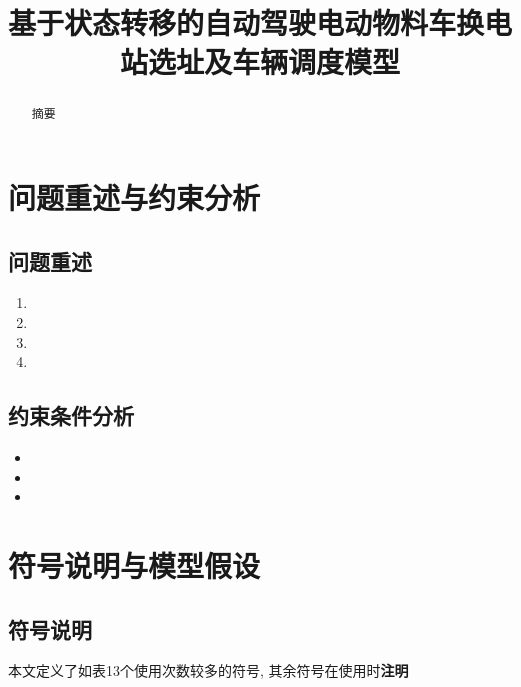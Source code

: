 \documentclass[withoutpreface,bwprint]{cumcmthesis} %
\title{基于状态转移的自动驾驶电动物料车换电站选址及车辆调度模型}
\begin{document}
	
	\maketitle
	\begin{abstract}
		摘要
		
		
		\quad
		
		
\end{abstract}


\setcounter{page}{1}    

\section{问题重述与约束分析}
\subsection{问题重述}



\begin{enumerate}
	\item 
	\item 
	\item 
	\item 
\end{enumerate}



\subsection{约束条件分析}

\begin{itemize}
	\item
	\item 
	\item 
\end{itemize}
 

\section{符号说明与模型假设}
\subsection{符号说明}
本文定义了如表13个使用次数较多的符号, 其余符号在使用时\textbf{注明}
\end{document}

